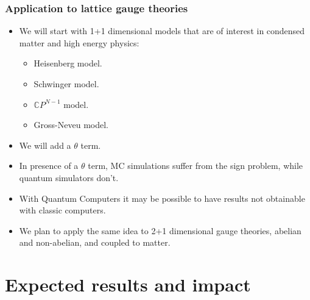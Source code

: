 \documentclass[10pt,t,xcolor=dvipsnames,aspectratio=169]{beamer}
\begin{document}
\begin{frame}
    \frametitle{Application to lattice gauge theories}
    \begin{itemize}
        \item
            We will start with 1+1 dimensional models that are of interest in condensed matter and high energy physics:
            \begin{itemize}
                \item Heisenberg model.
                \item Schwinger model.
                \item $\mathbb CP^{N-1}$ model.
                \item Gross-Neveu model.
            \end{itemize}
        \item
            We will add a $\theta$ term.
        \item
            In presence of a $\theta$ term, MC simulations suffer from the sign problem, while quantum simulators don't.
        \item
            With Quantum Computers it may be possible to have results not obtainable with classic computers.
        \item
            We plan to apply the same idea to 2+1 dimensional gauge theories, abelian and non-abelian, and coupled to matter.
    \end{itemize}
\end{frame}


\section{Expected results and impact}
\end{document}
